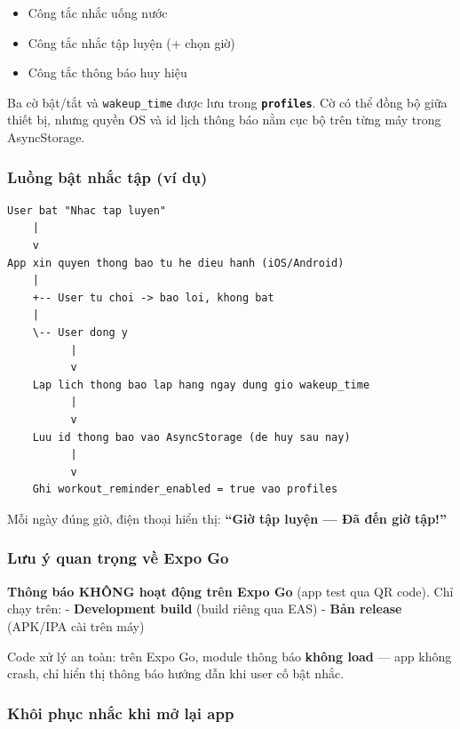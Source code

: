 \documentclass[12pt,a4paper]{article}
\providecommand{\tightlist}{%
  \setlength{\itemsep}{0pt}\setlength{\parskip}{0pt}}
\begin{document}
\begin{itemize}
\tightlist
\item
  Công tắc nhắc uống nước
\item
  Công tắc nhắc tập luyện (+ chọn giờ)
\item
  Công tắc thông báo huy hiệu
\end{itemize}

Ba cờ bật/tắt và \texttt{wakeup\_time} được lưu trong
\textbf{\texttt{profiles}}. Cờ có thể đồng bộ giữa thiết bị, nhưng quyền
OS và id lịch thông báo nằm cục bộ trên từng máy trong AsyncStorage.

\subsubsection{Luồng bật nhắc tập (ví
dụ)}\label{luux1ed3ng-bux1eadt-nhux1eafc-tux1eadp-vuxed-dux1ee5}

\begin{verbatim}
User bat "Nhac tap luyen"
    |
    v
App xin quyen thong bao tu he dieu hanh (iOS/Android)
    |
    +-- User tu choi -> bao loi, khong bat
    |
    \-- User dong y
          |
          v
    Lap lich thong bao lap hang ngay dung gio wakeup_time
          |
          v
    Luu id thong bao vao AsyncStorage (de huy sau nay)
          |
          v
    Ghi workout_reminder_enabled = true vao profiles
\end{verbatim}

Mỗi ngày đúng giờ, điện thoại hiển thị: \textbf{``Giờ tập luyện --- Đã
đến giờ tập!''}

\subsubsection{Lưu ý quan trọng về Expo
Go}\label{lux1b0u-uxfd-quan-trux1ecdng-vux1ec1-expo-go}

\textbf{Thông báo KHÔNG hoạt động trên Expo Go} (app test qua QR code).
Chỉ chạy trên: - \textbf{Development build} (build riêng qua EAS) -
\textbf{Bản release} (APK/IPA cài trên máy)

Code xử lý an toàn: trên Expo Go, module thông báo \textbf{không load}
--- app không crash, chỉ hiển thị thông báo hướng dẫn khi user cố bật
nhắc.

\subsubsection{Khôi phục nhắc khi mở lại
app}\label{khuxf4i-phux1ee5c-nhux1eafc-khi-mux1edf-lux1ea1i-app}
\end{document}
